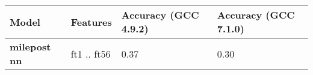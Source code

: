     \begin{tabular}{|l|p{1.2in}|p{0.9in}|p{0.9in}|}
     \hline
      \textbf{Model} & \textbf{Features} & \textbf{Accuracy (GCC 4.9.2)} & \textbf{Accuracy (GCC 7.1.0)} \\ 
     \hline
      \textbf{ milepost nn } &  ft1 .. ft56  &  0.37  &  0.30 \\
     \hline
    \end{tabular}    